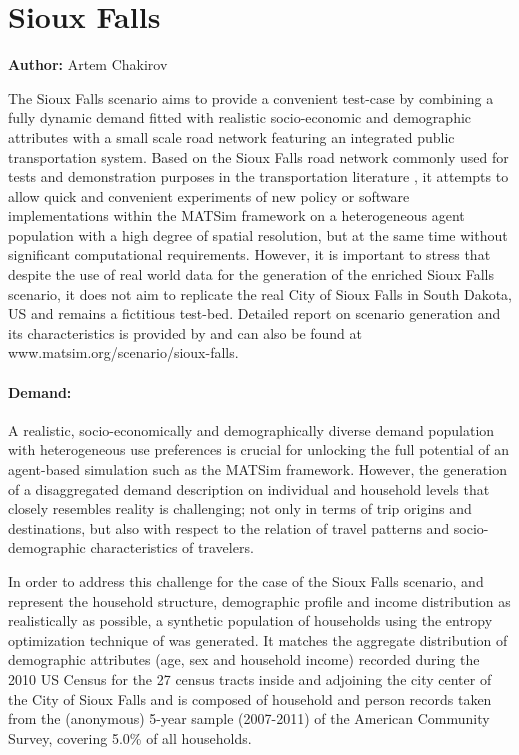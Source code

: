 \section{Sioux Falls}
\label{ch:scenarios:siouxfalls}
\hfill \textbf{Author:} Artem Chakirov

The Sioux Falls scenario aims to provide a convenient test-case by combining a fully dynamic demand fitted with realistic socio-economic and demographic attributes with a small scale road network featuring an integrated public transportation system. Based on the Sioux Falls road network commonly used for tests and demonstration purposes in the transportation literature \citep[][]{BarGera_TNTP_Webpage_2013}, it attempts to allow quick and convenient experiments of new policy or software implementations within the MATSim framework on a heterogeneous agent population with a high degree of spatial resolution, but at the same time without significant computational requirements. However, it is important to stress that despite the use of real world data for the generation of the enriched Sioux Falls scenario, it does not aim to replicate the real City of Sioux Falls in South Dakota, US and remains a fictitious test-bed. Detailed report on scenario generation and its characteristics is provided by \citet[][]{ChakirovFourie_TechRep_FCL_2014} and can also be found at www.matsim.org/scenario/sioux-falls. 

\paragraph{Demand:}

A realistic, socio-economically and demographically diverse demand population with  heterogeneous use preferences is crucial for unlocking the full potential of an agent-based simulation such as the MATSim framework. However, the generation of a disaggregated demand description on individual and household levels that closely resembles reality is challenging; not only in terms of trip origins and destinations, but also with respect to the relation of travel patterns and socio-demographic characteristics of travelers.

In order to address this challenge for the case of the Sioux Falls scenario, and represent the household structure, demographic profile and income distribution as realistically as possible, a synthetic population of households using the entropy optimization technique of \citet[][]{BarGeraEtAl_TRB_2009} was generated. It matches the aggregate distribution of demographic attributes (age, sex and household income) recorded during the 2010 US Census for the 27 census tracts inside and adjoining the city center of the City of Sioux Falls and is composed of household and person records taken from the (anonymous) 5-year sample (2007-2011) of the American Community Survey, covering 5.0\% of all households.

